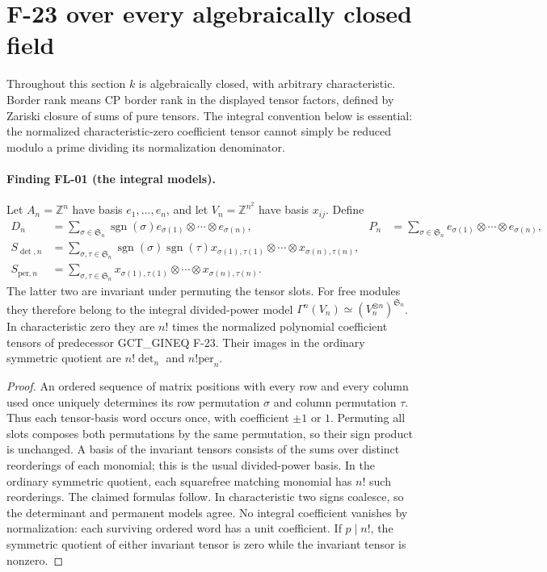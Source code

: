 \section{F-23 over every algebraically closed field}
\label{sec:fields}

Throughout this section $k$ is algebraically closed, with arbitrary
characteristic. Border rank means CP border rank in the displayed
tensor factors, defined by Zariski closure of sums of pure tensors.
The integral convention below is essential: the normalized
characteristic-zero coefficient tensor cannot simply be reduced
modulo a prime dividing its normalization denominator.

\paragraph{Finding FL-01 (the integral models).}
Let $A_n=\mathbb Z^n$ have basis $e_1,\ldots,e_n$, and let
$V_n=\mathbb Z^{n^2}$ have basis $x_{ij}$.
Define
\begin{align*}
 D_n&=\sum_{\sigma\in\mathfrak S_n}\operatorname{sgn}(\sigma)
             e_{\sigma(1)}\otimes\cdots\otimes e_{\sigma(n)},&
 P_n&=\sum_{\sigma\in\mathfrak S_n}
             e_{\sigma(1)}\otimes\cdots\otimes e_{\sigma(n)},\\
 S_{\det,n}&=\sum_{\sigma,\tau\in\mathfrak S_n}
       \operatorname{sgn}(\sigma)\operatorname{sgn}(\tau)
       x_{\sigma(1),\tau(1)}\otimes\cdots\otimes x_{\sigma(n),\tau(n)},\\
 S_{\mathrm{per},n}&=\sum_{\sigma,\tau\in\mathfrak S_n}
       x_{\sigma(1),\tau(1)}\otimes\cdots\otimes x_{\sigma(n),\tau(n)}.
\end{align*}
The latter two are invariant under permuting the tensor slots.
For free modules they therefore belong to the integral divided-power
model $\Gamma^n(V_n)\simeq(V_n^{\otimes n})^{\mathfrak S_n}$.
In characteristic zero they are $n!$ times the normalized polynomial
coefficient tensors of predecessor GCT\_GINEQ F-23. Their images in
the ordinary symmetric quotient are $n!\det_n$ and $n!\mathrm{per}_n$.

\begin{proof}
An ordered sequence of matrix positions with every row and every
column used once uniquely determines its row permutation $\sigma$
and column permutation $\tau$. Thus each tensor-basis word occurs
once, with coefficient $\pm1$ or $1$. Permuting all slots composes
both permutations by the same permutation, so their sign product
is unchanged. A basis of the invariant tensors consists of the sums
over distinct reorderings of each monomial; this is the usual
divided-power basis. In the ordinary symmetric quotient, each
squarefree matching monomial has $n!$ such reorderings. The claimed
formulas follow. In characteristic two signs coalesce, so the
determinant and permanent models agree. No integral coefficient
vanishes by normalization: each surviving ordered word has a unit
coefficient. If $p\mid n!$, the symmetric quotient of either
invariant tensor is zero while the invariant tensor is nonzero.
\end{proof}

